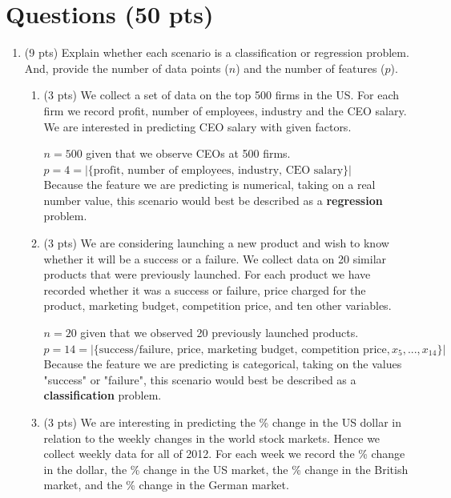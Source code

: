 \documentclass[a4paper]{article}
\theoremstyle{definition}
\newenvironment{soln}{
    \leavevmode\color{blue}\ignorespaces
}{}
\begin{document}
\section{Questions (50 pts)}
\begin{enumerate}
\item (9 pts) Explain whether each scenario is a classification or regression problem. And, provide the number of data points ($n$) and the number of features ($p$).

\begin{enumerate}
	\item (3 pts) We collect a set of data on the top 500 firms in the US. For each firm we record profit, number of employees, industry and the CEO salary. We are interested in predicting CEO salary with given factors.
	
	\begin{soln}  
            $n = 500$ given that we observe CEOs at 500 firms.
            \\ $p = 4 = |\{ \text{profit, number of employees, industry, CEO salary}\}|$
            \\ Because the feature we are predicting is numerical, taking on a real number value, this scenario would best be described as a \textbf{regression} problem.
        \end{soln}
	
	\item (3 pts) We are considering launching a new product and wish to know whether it will be a success or a failure. We collect data on 20 similar products that were previously launched. For each product we have recorded whether it was a success or failure, price charged for the product, marketing budget, competition price, and ten other variables.
	
	\begin{soln}  
            $n = 20$ given that we observed 20 previously launched products.
            \\ $p = 14 = |\{ \text{success/failure, price, marketing budget, competition price}, x_{5}, ... , x_{14} \}|$
            \\ Because the feature we are predicting is categorical, taking on the values "success" or "failure", this scenario would best be described as a \textbf{classification} problem.
        \end{soln}
	
	\item (3 pts) We are interesting in predicting the \% change in the US dollar in relation to the weekly changes in the world stock markets. Hence we collect weekly data for all of 2012. For each week we record the \% change in the dollar, the \% change in the US market, the \% change in the British market, and the \% change in the German market.
	

\end{enumerate}
\end{enumerate}
\end{document}

